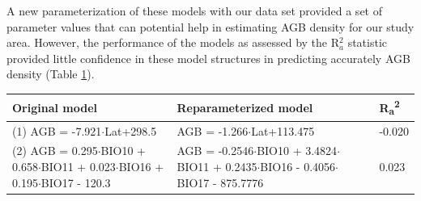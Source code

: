 \documentclass[review, authoryear]{elsarticle}   	%
\DeclareRobustCommand{\Jhoa}{\todo[author=Jhoa, inline, color=yellow!40, size=\small]}
\begin{document}
A  new parameterization of these models with our data set provided a set of parameter values that can potential help in estimating AGB density for our study area. However, the performance of the models as assessed by the R$_a^2$ statistic provided little confidence in these model structures in predicting accurately AGB density (Table \ref{tab:globalModels}).

\begin{table}[htbp]
   \centering
  
   \begin{tabular}{p{6.5cm}p{6.5cm}p{1.5cm}}  %
      \toprule
       Original model   & Reparameterized model & R\textsubscript{a}\textsuperscript{2}\\
      \midrule
       (1) AGB = -7.921$\cdot$Lat+298.5 & AGB = -1.266$\cdot$Lat+113.475   & -0.020\\
       (2) AGB = 0.295$\cdot$BIO10 + 0.658$\cdot$BIO11 + 0.023$\cdot$BIO16 + 0.195$\cdot$BIO17 - 120.3 & AGB = -0.2546$\cdot$BIO10 + 3.4824$\cdot$BIO11 + 0.2435$\cdot$BIO16 - 0.4056$\cdot$BIO17 - 875.7776 & 0.023\\ 
        \bottomrule
   \end{tabular}
   \label{tab:globalModels}
\end{table}


\end{document}
